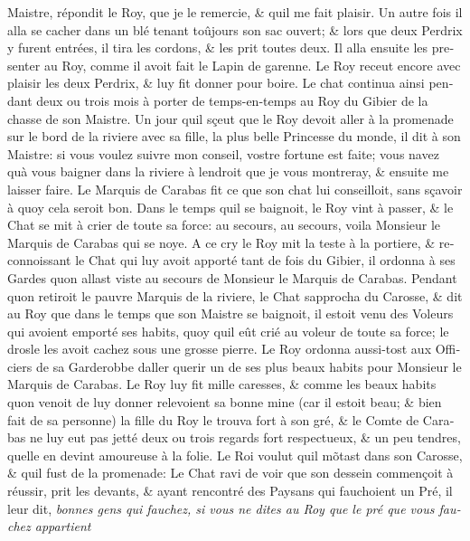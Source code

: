 \documentclass[14pt,a4paper]{memoir}
\begin{document}
{{\begin{otherlanguage}{french}
Maistre, répondit le Roy, que je le remercie, \& qu\textquotesingle il
me fait plaisir. Un autre fois il alla se cacher dans un blé tenant
toûjours son sac ouvert; \& lors que deux Perdrix y furent entrées, il
tira les cordons, \& les prit toutes deux. Il alla ensuite les presenter
au Roy, comme il avoit fait le Lapin de garenne. Le Roy receut encore
avec plaisir les deux Perdrix, \& luy fit donner pour boire. Le chat
continua ainsi pendant deux ou trois mois à porter de temps-en-temps au
Roy du Gibier de la chasse de son Maistre. Un jour qu\textquotesingle il
sçeut que le Roy devoit aller à la promenade sur le bord de la riviere
avec sa fille, la plus belle Princesse du monde, il dit à son Maistre:
si vous voulez suivre mon conseil, vostre fortune est faite; vous
n\textquotesingle avez qu\textquotesingle à vous baigner dans la riviere
à l\textquotesingle endroit que je vous montreray, \& ensuite me laisser
faire. Le Marquis de Carabas fit ce que son chat lui conseilloit, sans
sçavoir à quoy cela seroit bon. Dans le temps qu\textquotesingle il se
baignoit, le Roy vint à passer, \& le Chat se mit à crier de toute sa
force: au secours, au secours, voila Monsieur le Marquis de Carabas qui
se noye. A ce cry le Roy mit la teste à la portiere, \& reconnoissant le
Chat qui luy avoit apporté tant de fois du Gibier, il ordonna à ses
Gardes qu\textquotesingle on allast viste au secours de Monsieur le
Marquis de Carabas. Pendant qu\textquotesingle on retiroit le pauvre
Marquis de la riviere, le Chat s\textquotesingle approcha du Carosse, \&
dit au Roy que dans le temps que son Maistre se baignoit, il estoit venu
des Voleurs qui avoient emporté ses habits, quoy qu\textquotesingle il
eût crié au voleur de toute sa force; le drosle les avoit cachez sous
une grosse pierre. Le Roy ordonna aussi-tost aux Officiers de sa
Garderobbe d\textquotesingle aller querir un de ses plus beaux habits
pour Monsieur le Marquis de Carabas. Le Roy luy fit mille caresses, \&
comme les beaux habits qu\textquotesingle on venoit de luy donner
relevoient sa bonne mine (car il estoit beau; \& bien fait de sa
personne) la fille du Roy le trouva fort à son gré, \& le Comte de
Carabas ne luy eut pas jetté deux ou trois regards fort respectueux, \&
un peu tendres, qu\textquotesingle elle en devint amoureuse à la folie.
Le Roi voulut qu\textquotesingle il mõtast dans son Carosse, \&
qu\textquotesingle il fust de la promenade: Le Chat ravi de voir que son
dessein commençoit à réussir, prit les devants, \& ayant rencontré des
Paysans qui fauchoient un Pré, il leur dit, \emph{bonnes gens qui
fauchez, si vous ne dites au Roy que le pré que vous fauchez appartient
}
\end{otherlanguage}}}
\end{document}
